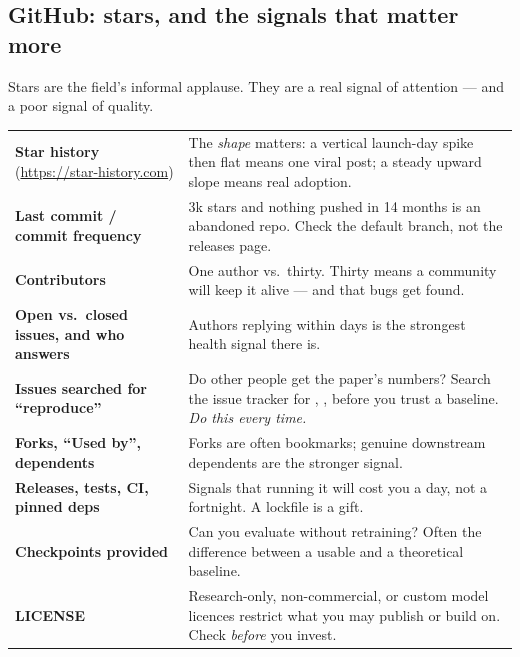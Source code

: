 \documentclass[11pt,a4paper]{article}
\begin{document}
\subsection{GitHub: stars, and the signals that matter more}

Stars are the field's informal applause. They are a real signal of attention
--- and a poor signal of quality.

\begin{table}[h]
\centering
\small
\begin{tabularx}{\textwidth}{L{4.6cm} X}
\toprule
{} &  \\
\midrule
{}
\textbf{Star history} (\url{https://star-history.com}) & The \emph{shape}
matters: a vertical launch-day spike then flat means one viral post; a steady
upward slope means real adoption. \\
\textbf{Last commit / commit frequency} & 3k stars and nothing pushed in
14 months is an abandoned repo. Check the default branch, not the releases
page. \\
\textbf{Contributors} & One author vs.\ thirty. Thirty means a community will
keep it alive --- and that bugs get found. \\
\textbf{Open vs.\ closed issues, and who answers} & Authors replying within
days is the strongest health signal there is. \\
\textbf{Issues searched for ``reproduce''} & Do other people get the paper's
numbers? Search the issue tracker for , ,
 before you trust a baseline. \emph{Do this every time.} \\
\textbf{Forks, ``Used by'', dependents} & Forks are often bookmarks; genuine
downstream dependents are the stronger signal. \\
\textbf{Releases, tests, CI, pinned deps} & Signals that running it will cost
you a day, not a fortnight. A lockfile is a gift. \\
\textbf{Checkpoints provided} & Can you evaluate without retraining? Often the
difference between a usable and a theoretical baseline. \\
\textbf{LICENSE} & Research-only, non-commercial, or custom model licences
restrict what you may publish or build on. Check \emph{before} you invest. \\
\bottomrule
\end{tabularx}
\end{table}
\end{document}
